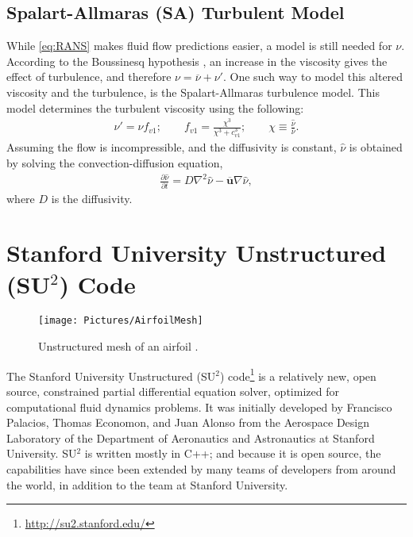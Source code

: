 \documentclass[10pt, titlepage]{article}
\begin{document}
\subsection{Spalart-Allmaras (SA) Turbulent Model}
While \eqref{eq:RANS} makes fluid flow predictions easier, a model is still needed for $\nu$. According to the Boussinesq hypothesis \cite{Boussinesq}, an increase in the viscosity gives the effect of turbulence, and therefore $\nu = \overline{\nu} + \nu'$. One such way to model this altered viscosity and the turbulence, is the Spalart-Allmaras turbulence model. This model determines the turbulent viscosity using the following:
\begin{align}
\nu' = \hat{\nu} f_{v1}; \qquad f_{v1} = \frac{\chi^3}{\chi^3+c_{v1}^3}; \qquad \chi \equiv \frac{\hat{\nu}}{\overline{\nu}}.
\label{eq:saeq}
\end{align}
Assuming the flow is incompressible, and the diffusivity is constant, $\hat{\nu}$ is obtained by solving the convection-diffusion equation,
\begin{align*}
\frac{\partial \hat{\nu}}{\partial t} = D \nabla^2 \hat{\nu} - \overline{\mathbf{u}} \nabla \hat{\nu},
\end{align*}
where $D$ is the diffusivity.

\section{Stanford University Unstructured (SU$^2$) Code}

\begin{wrapfigure}{L}{0.45\textwidth}
\centering
\texttt{[image: Pictures/AirfoilMesh]}
\caption[Mesh of an Airfoil]{Unstructured mesh of an airfoil \cite{mesh}.}
\label{fig:airfoilmesh}
\end{wrapfigure}

The Stanford University Unstructured (SU$^2$) code\footnote{\url{http://su2.stanford.edu/}} is a relatively new, open source, constrained partial differential equation solver, optimized for computational fluid dynamics problems. It was initially developed by Francisco Palacios, Thomas Economon, and Juan Alonso from the Aerospace Design Laboratory of the Department of Aeronautics and Astronautics at Stanford University. SU$^2$ is written mostly in C++; and because it is open source, the capabilities have since been extended by many teams of developers from around the world, in addition to the team at Stanford University. \\
\end{document}
